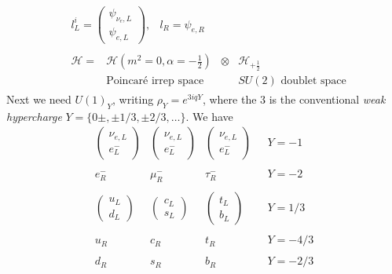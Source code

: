 \begin{equation}
\begin{split}
    &\begin{matrix}
    l^i_L = \begin{pmatrix}
        \psi_{\nu_e,L}\\
        \psi_{e,L}
    \end{pmatrix}, & l_R = \psi_{e,R}
    \end{matrix}\\
&\begin{matrix}
    \mathcal{H} = &\mathcal{H}(m^2=0, \alpha=-\frac{1}{2})&\otimes&\mathcal{H}_{+\frac{1}{2}}\\
     & \text{Poincar\'e irrep space}& &SU(2) \text{ doublet space}
\end{matrix}
    \end{split}
\end{equation}
Next we need $U(1)_Y$, writing  $\rho_Y = e^{3iqY}$, where the $3$ is the conventional \textit{weak hypercharge} $Y = \{0\pm, \pm 1/3, \pm2/3, \dots \}$. We have
\begin{equation}
    \begin{matrix}
        \begin{pmatrix}
            \nu_{e,L}\\
            e^-_L
        \end{pmatrix}
        &
        \begin{pmatrix}
            \nu_{e,L}\\
            e^-_L
        \end{pmatrix} 
        & 
        \begin{pmatrix}
            \nu_{e,L}\\
            e^-_L
        \end{pmatrix}        
        &
        \ \ \ Y = -1\\ \\
        e^-_R
        &
        \mu^-_R
        &
        \tau^-_R
        &
        \ \ \ Y = -2\\ \\
         \begin{pmatrix}
            u_L\\
            d_L
        \end{pmatrix}
        &
        \begin{pmatrix}
            c_L\\
            s_L
        \end{pmatrix} 
        & 
        \begin{pmatrix}
            t_L\\
            b_L
        \end{pmatrix}        
        &
        \ \ \ Y = 1/3\\ \\
        u_R
        &
        c_R
        &
        t_R
        &
        \ \ \ Y = -4/3\\ \\
        d_R
        &
        s_R
        &
        b_R
        &
        \ \ \ Y = -2/3\\ \\
    \end{matrix}
\end{equation}
